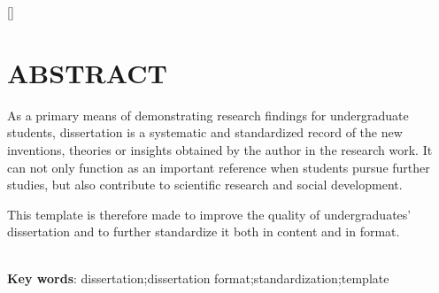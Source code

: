 \newpage
{}

[]

\section*{ABSTRACT}

As a primary means of demonstrating research findings for undergraduate students, dissertation is a systematic and standardized record of the new inventions, theories or insights obtained by the author in the research work. It can not only function as an important reference when students pursue further studies, but also contribute to scientific research and social development.\par 
This template is therefore made to improve the quality of undergraduates’ dissertation and to further standardize it both in content and in format.

~\\ 
\hspace*{2em}\textbf{Key words}: dissertation;dissertation format;standardization;template\\
